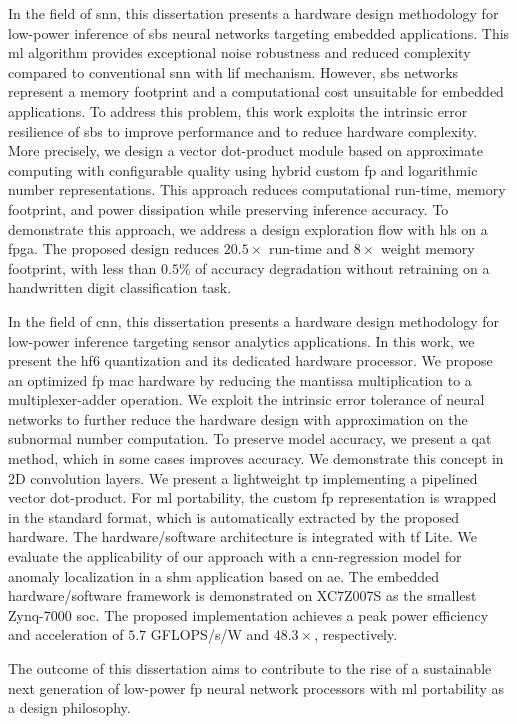 In the field of \gls{snn}, this dissertation presents a hardware design methodology for low-power inference of \gls{sbs} neural networks targeting embedded applications. This \gls{ml} algorithm provides exceptional noise robustness and reduced complexity compared to conventional \gls{snn} with \gls{lif} mechanism. However, \gls{sbs} networks represent a memory footprint and a computational cost unsuitable for embedded applications. To address this problem, this work exploits the intrinsic error resilience of \gls{sbs} to improve performance and to reduce hardware complexity. More precisely, we design a vector dot-product module based on approximate computing with configurable quality using hybrid custom \gls{fp} and logarithmic number representations. This approach reduces computational run-time, memory footprint, and power dissipation while preserving inference accuracy. To demonstrate this approach, we address a design exploration flow with \gls{hls} on a \gls{fpga}. The proposed design reduces $20.5\times$ run-time and $8\times$ weight memory footprint, with less than $0.5\%$ of accuracy degradation without retraining on a handwritten digit classification task.

In the field of \gls{cnn}, this dissertation presents a hardware design methodology for low-power inference targeting sensor analytics applications. In this work, we present the \gls{hf6} quantization and its dedicated hardware processor. We propose an optimized \gls{fp} \gls{mac} hardware by reducing the mantissa multiplication to a multiplexer-adder operation. We exploit the intrinsic error tolerance of neural networks to further reduce the hardware design with approximation on the subnormal number computation. To preserve model accuracy, we present a \gls{qat} method, which in some cases improves accuracy. We demonstrate this concept in 2D convolution layers. We present a lightweight \gls{tp} implementing a pipelined vector dot-product. For \gls{ml} portability, the custom \gls{fp} representation is wrapped in the standard format, which is automatically extracted by the proposed hardware. The hardware/software architecture is integrated with \gls{tf} Lite. We evaluate the applicability of our approach with a \gls{cnn}-regression model for anomaly localization in a \gls{shm} application based on \gls{ae}. The embedded hardware/software framework is demonstrated on XC7Z007S as the smallest Zynq-7000 \gls{soc}. The proposed implementation achieves a peak power efficiency and acceleration of $5.7$ GFLOPS/s/W and $48.3\times$, respectively.

The outcome of this dissertation aims to contribute to the rise of a sustainable next generation of low-power \gls{fp} neural network processors with \gls{ml} portability as a design philosophy.